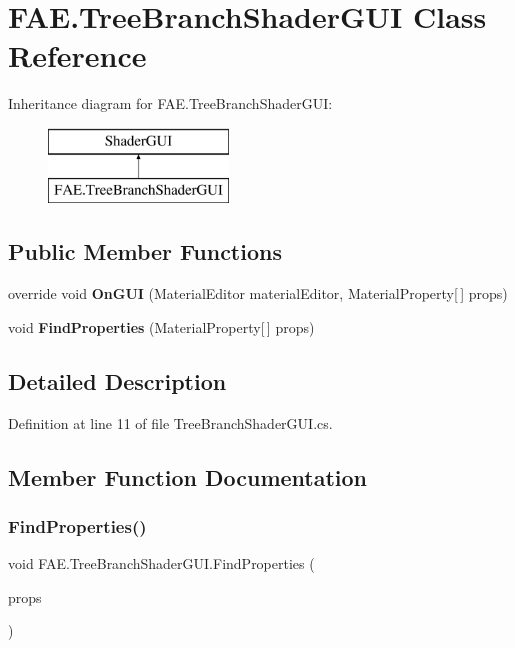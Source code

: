 \section{F\+A\+E.\+Tree\+Branch\+Shader\+G\+UI Class Reference}
\label{class_f_a_e_1_1_tree_branch_shader_g_u_i}
Inheritance diagram for F\+A\+E.\+Tree\+Branch\+Shader\+G\+UI\+:\begin{figure}[H]
\begin{center}
\leavevmode
\includegraphics[height=2.000000cm]{class_f_a_e_1_1_tree_branch_shader_g_u_i}
\end{center}
\end{figure}
\subsection*{Public Member Functions}
\begin{DoxyCompactItemize}
\item 
override void \textbf{ On\+G\+UI} (Material\+Editor material\+Editor, Material\+Property[$\,$] props)
\item 
void \textbf{ Find\+Properties} (Material\+Property[$\,$] props)
\end{DoxyCompactItemize}


\subsection{Detailed Description}


Definition at line 11 of file Tree\+Branch\+Shader\+G\+U\+I.\+cs.



\subsection{Member Function Documentation}
\mbox{\label{class_f_a_e_1_1_tree_branch_shader_g_u_i_a72941c6f9f880f7f7eab1b285f11b18e}} 
\subsubsection{Find\+Properties()}
{\footnotesize\ttfamily void F\+A\+E.\+Tree\+Branch\+Shader\+G\+U\+I.\+Find\+Properties (\begin{DoxyParamCaption}\item[{Material\+Property [$\,$]}]{props }\end{DoxyParamCaption})}



